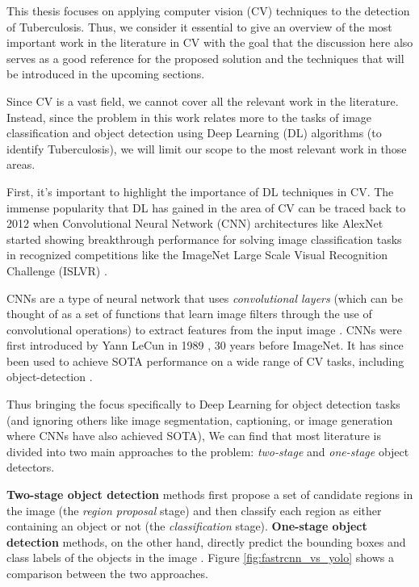\documentclass[../main.tex]{subfiles}
\begin{document}
    This thesis focuses on applying computer vision (CV) techniques to the detection of Tuberculosis. Thus, we consider it essential to give an overview of the most important work in the literature in CV with the goal that the discussion here also serves as a good reference for the proposed solution and the techniques that will be introduced in the upcoming sections. 
    
    Since CV is a vast field, we cannot cover all the relevant work in the literature. Instead, since the problem in this work relates more to the tasks of image classification and object detection using Deep Learning (DL) algorithms (to identify Tuberculosis), we will limit our scope to the most relevant work in those areas.

    First, it's important to highlight the importance of DL techniques in CV. The immense popularity that DL has gained in the area of CV can be traced back to 2012 when Convolutional Neural Network (CNN) architectures like AlexNet \cite{dengImageNetLargescaleHierarchical2009} started showing breakthrough performance for solving image classification tasks in recognized competitions like the ImageNet Large Scale Visual Recognition Challenge (ISLVR) \cite{krizhevskyImageNetClassificationDeep2012}.
    
    CNNs are a type of neural network that uses \textit{convolutional layers} (which can be thought of as a set of functions that learn image filters through the use of convolutional operations) to extract features from the input image \autocite{goodfellowDeepLearning2016}. CNNs were first introduced by Yann LeCun in 1989 \cite{lecunBackpropagationAppliedHandwritten1989}, 30 years before ImageNet. It has since been used to achieve SOTA performance on a wide range of CV tasks, including object-detection \cite{lecun_deep_2015,zouObjectDetection202023b}.

    Thus bringing the focus specifically to Deep Learning for object detection tasks
    (and ignoring others like image segmentation, captioning, or image generation where CNNs have also achieved SOTA), We can find that most literature is divided into two main approaches to the problem: \textit{two-stage} and \textit{one-stage} object detectors.
    
    \textbf{Two-stage object detection} methods first propose a set of candidate regions in the image (the \textit{region proposal} stage) and then classify each region as either containing an object or not (the \textit{classification} stage). \textbf{One-stage object detection} methods, on the other hand, directly predict the bounding boxes and class labels of the objects in the image \cite{zouObjectDetection202023b}. Figure \ref{fig:fastrcnn_vs_yolo} shows a comparison between the two approaches.
    
\end{document}
